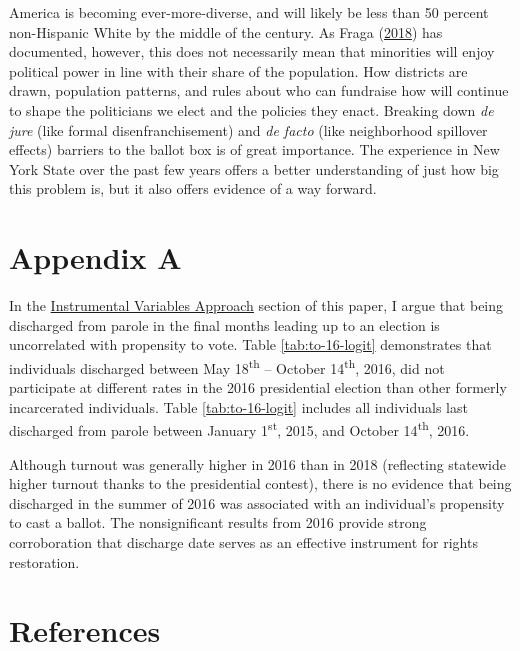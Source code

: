 \documentclass[
  12pt,
]{article}
\begin{document}
America is becoming ever-more-diverse, and will likely be less than 50 percent non-Hispanic White by the middle of the century. As Fraga (\protect\hyperlink{ref-Fraga2018}{2018}) has documented, however, this does not necessarily mean that minorities will enjoy political power in line with their share of the population. How districts are drawn, population patterns, and rules about who can fundraise how will continue to shape the politicians we elect and the policies they enact. Breaking down \emph{de jure} (like formal disenfranchisement) and \emph{de facto} (like neighborhood spillover effects) barriers to the ballot box is of great importance. The experience in New York State over the past few years offers a better understanding of just how big this problem is, but it also offers evidence of a way forward.

\newpage

\hypertarget{appendix-a}{%
\section*{Appendix A}\label{appendix-a}}

In the \protect\hyperlink{instrumental-variables-approach}{Instrumental Variables Approach} section of this paper, I argue that being discharged from parole in the final months leading up to an election is uncorrelated with propensity to vote. Table \ref{tab:to-16-logit} demonstrates that individuals discharged between May 18\textsuperscript{th} -- October 14\textsuperscript{th}, 2016, did not participate at different rates in the 2016 presidential election than other formerly incarcerated individuals. Table \ref{tab:to-16-logit} includes all individuals last discharged from parole between January 1\textsuperscript{st}, 2015, and October 14\textsuperscript{th}, 2016.



Although turnout was generally higher in 2016 than in 2018 (reflecting statewide higher turnout thanks to the presidential contest), there is no evidence that being discharged in the summer of 2016 was associated with an individual's propensity to cast a ballot. The nonsignificant results from 2016 provide strong corroboration that discharge date serves as an effective instrument for rights restoration.

\newpage

\hypertarget{references}{%
\section*{References}\label{references}}
\end{document}

